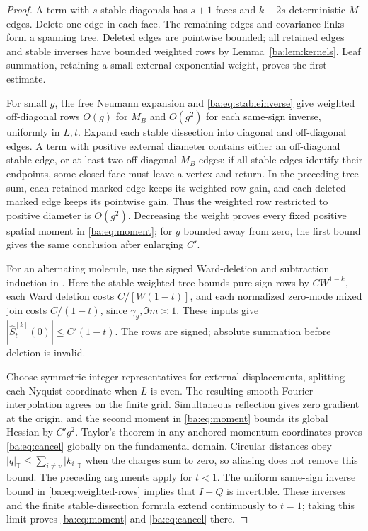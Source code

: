 \documentclass[11pt]{article}
\numberwithin{equation}{section}
\theoremstyle{remark}
\begin{document}
\begin{proof}
A term with $s$ stable diagonals has $s+1$ faces and $k+2s$
deterministic $M$-edges. Delete one edge in each face. The remaining
edges and covariance links form a spanning tree. Deleted edges are
pointwise bounded; all retained edges and stable inverses have bounded
weighted rows by Lemma~\ref{ba:lem:kernels}. Leaf summation, retaining
a small external exponential weight, proves the first estimate.

For small $g$, the free Neumann expansion and
\eqref{ba:eq:stableinverse} give weighted off-diagonal rows $O(g)$
for $M_B$ and $O(g^2)$ for each same-sign inverse, uniformly in $L,t$.
Expand each stable dissection into diagonal and off-diagonal edges.
A term with positive external diameter contains either an off-diagonal
stable edge, or at least two off-diagonal $M_B$-edges: if all stable
edges identify their endpoints, some closed face must leave a vertex
and return. In the preceding tree sum, each retained marked edge
keeps its weighted row gain, and each deleted marked edge keeps its
pointwise gain. Thus the weighted row restricted to positive diameter
is $O(g^2)$. Decreasing the weight proves every fixed positive spatial
moment in \eqref{ba:eq:moment}; for $g$ bounded away from zero, the
first bound gives the same conclusion after enlarging $C'$.

For an alternating molecule, use the signed Ward-deletion and subtraction
induction in \cite[Corollary~4.28 and proof of Lemma~4.29, (4.45)--(4.46)]{TYY}.
Here the stable weighted tree bounds pure-sign rows by $CW^{1-k}$,
each Ward deletion costs $C/[W(1-t)]$, and each normalized zero-mode
mixed join costs $C/(1-t)$, since $\gamma_g,\Im m\asymp1$.
These inputs give $|\widehat S_t^{[k]}(0)|\le C'(1-t)$.
The rows are signed; absolute summation before deletion is invalid.

Choose symmetric integer representatives for external displacements,
splitting each Nyquist coordinate when $L$ is even. The resulting
smooth Fourier interpolation agrees on the finite grid. Simultaneous
reflection gives zero gradient at the origin, and the second moment
in \eqref{ba:eq:moment} bounds its global Hessian by $C'g^2$.
Taylor's theorem in any anchored momentum coordinates proves
\eqref{ba:eq:cancel} globally on the fundamental domain. Circular
distances obey $|q|_{\mathbb T}\le\sum_{i\ne v}|k_i|_{\mathbb T}$
when the charges sum to zero, so aliasing does not remove this bound.
The preceding arguments apply for $t<1$. The uniform same-sign inverse
bound in \eqref{ba:eq:weighted-rows} implies that $I-Q$ is invertible.
These inverses and the finite stable-dissection formula extend continuously
to $t=1$; taking this limit proves \eqref{ba:eq:moment} and
\eqref{ba:eq:cancel} there.
\end{proof}
\end{document}
